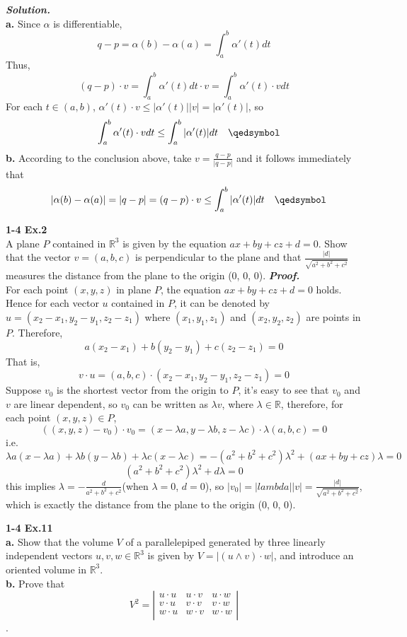 \documentclass{article}
\begin{document}
\par
\textbf{\textit{Solution.}}\\
\textbf{a. } Since $\alpha$ is differentiable,
$$
    q - p = \alpha(b) - \alpha(a) = \int_a^b \alpha'(t)dt
$$
Thus,
$$
    (q - p) \cdot v = \int_a^b \alpha'(t) dt \cdot v = \int_a^b \alpha'(t) \cdot vdt
$$
For each $t \in (a, b)$, $\alpha'(t) \cdot v \leq |\alpha'(t)||v| = |\alpha'(t)|$, so
$$
    \quad \int_a^b \alpha'(t) \cdot vdt \leq \int_a^b |\alpha'(t)|dt \quad \qedsymbol
$$
\textbf{b. } According to the conclusion above, take $v = \frac{q - p}{|q - p|}$ and
it follows immediately that
$$
    \quad |\alpha(b) - \alpha(a)| = |q - p| = (q - p) \cdot v \leq \int_a^b |\alpha'(t)|dt \quad \qedsymbol
$$

\par
\textbf{1-4 Ex.2}\\
A plane $P$ contained in $\mathbb{R}^3$ is given by the equation $ax+by+cz+d=0$. Show that the vector $v=(a,b,c)$
is perpendicular to the plane and that $\frac{|d|}{\sqrt{a^2+b^2+c^2}}$ measures the distance from the plane to the origin
(0, 0, 0).
\textbf{\textit{Proof.}}\\
For each point $(x, y, z)$ in plane $P$, the equation $ax+by+cz+d=0$ holds. Hence for each vector $u$ contained in $P$,
it can be denoted by $u = (x_2-x_1, y_2-y_1, z_2-z_1)$ where $(x_1, y_1, z_1)$ and $(x_2, y_2, z_2)$ are points in $P$.
Therefore,
$$
    a(x_2-x_1) + b(y_2-y_1) + c(z_2-z_1) = 0
$$
That is,
$$
    v \cdot u = (a, b, c) \cdot (x_2-x_1, y_2-y_1, z_2-z_1) = 0
$$
Suppose $v_0$ is the shortest vector from the origin to $P$, it's easy to see that $v_0$ and $v$ are linear dependent, so
$v_0$ can be written as $\lambda v$, where $\lambda \in \mathbb{R}$, therefore, for each point $(x,y,z) \in P$, 
$$
    ((x,y,z) - v_0) \cdot v_0 = (x-\lambda a, y-\lambda b, z-\lambda c) \cdot \lambda (a,b,c) = 0
$$
i.e.
$$
    \lambda a(x-\lambda a) + \lambda b(y-\lambda b) + \lambda c(x-\lambda c) = -(a^2+b^2+c^2)\lambda^2 + (ax+by+cz)\lambda = 0
$$
$$
    (a^2+b^2+c^2)\lambda^2 + d\lambda = 0
$$
this implies $\lambda=-\frac{d}{a^2+b^2+c^2}$(when $\lambda = 0$, $d = 0$), so $|v_0| = |lambda||v| = \frac{|d|}{\sqrt{a^2+b^2+c^2}}$,
which is exactly the distance from the plane to the origin (0, 0, 0).

\par
\textbf{1-4 Ex.11}\\
\textbf{a. }Show that the volume $V$ of a parallelepiped generated by three linearly independent vectors $u,v,w \in \mathbb{R}^3$ is
given by $V = |(u \wedge v) \cdot w|$, and introduce an oriented volume in $\mathbb{R}^3$.\\
\textbf{b. }Prove that
$$
    V^2 = 
    \left|\begin{array}{ccc} 
        u \cdot u & u \cdot v & u \cdot w \\ 
        v \cdot u & v \cdot v & v \cdot w \\ 
        w \cdot u & w \cdot v & w \cdot w \\ 
    \end{array}\right|
$$.
\end{document}
